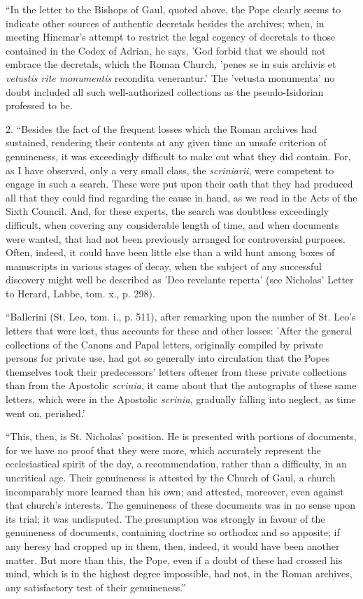 ``In the letter to the Bishops of Gaul, quoted
above, the Pope clearly seems to indicate other sources of authentic
decretals besides the archives; when, in meeting Hincmar's attempt to
restrict the legal cogency of decretals to those contained in the
Codex of Adrian, he says, 'God forbid that we should not embrace the
decretals, which the Roman Church, 'penes se in suis archivis et \emph{vetustis
rite monumentis} recondita venerantur.' The 'vetusta monumenta' no
doubt included all such well-authorized collections as the pseudo-Isidorian
professed to be.

2. ``Besides the fact of the frequent losses which
the Roman archives had sustained, rendering their contents at any
given time an unsafe criterion of genuineness, it was exceedingly
difficult to make out what they did contain. For, as I have observed,
only a very small class, the \emph{scriniarii}, were competent to
engage in such a search. These were put upon their oath that they had
produced all that they could find regarding the cause in hand, as we
read in the Acts of the Sixth Council. And, for these experts, the
search was doubtless exceedingly difficult, when covering any
considerable length of time, and when documents were wanted, that had
not been previously arranged for controversial purposes. Often,
indeed, it could have been little else than a wild hunt among boxes of
manuscripts in various stages of decay, when the subject of any
successful discovery might well be described as 'Deo revelante reperta' (see Nicholas' Letter to Herard, Labbe, tom. x., p. 298).

``Ballerini (St. Leo, tom. i., p. 511), after
remarking upon the number of St. Leo's letters that were lost, thus
accounts for these and other losses: 'After the general collections of
the Canons and Papal letters, originally compiled by private persons
for private use, had got so generally into circulation that the Popes
themselves took their predecessors' letters oftener from these private
collections than from the Apostolic \emph{scrinia}, it came about that
the autographs of these same letters, which were in the Apostolic \emph{scrinia},
gradually falling into neglect, as time went on, perished.'

``This, then, is St. Nicholas' position. He is
presented with portions of documents, for we have no proof that they
were more, which accurately represent the ecclesiastical spirit of the
day, a recommendation, rather than a difficulty, in an uncritical age.
Their genuineness is attested by the Church of Gaul, a church
incomparably more learned than his own; and attested, moreover, even
against that church's interests. The genuineness of these documents
was in no sense upon its trial; it was undisputed. The presumption was
strongly in favour of the genuineness of documents, containing
doctrine so orthodox and so apposite; if any heresy had cropped up in
them, then, indeed, it would have been another matter. But more than
this, the Pope, even if a doubt of these had crossed his mind, which
is in the highest degree impossible, had not, in the Roman archives,
any satisfactory test of their genuineness.''


